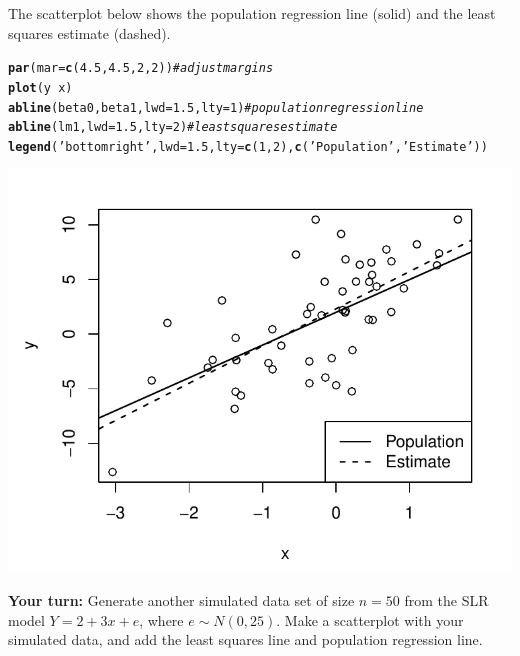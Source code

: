 \documentclass[11pt]{article}\usepackage[]{graphicx}\usepackage[]{color}
\makeatletter
\def\maxwidth{ %
  \ifdim\Gin@nat@width>\linewidth
    \linewidth
  \else
    \Gin@nat@width
  \fi
}
\newcommand{\hlnum}[1]{\textcolor[rgb]{0.686,0.059,0.569}{#1}}%
\newcommand{\hlstr}[1]{\textcolor[rgb]{0.192,0.494,0.8}{#1}}%
\newcommand{\hlcom}[1]{\textcolor[rgb]{0.678,0.584,0.686}{\textit{#1}}}%
\newcommand{\hlopt}[1]{\textcolor[rgb]{0,0,0}{#1}}%
\newcommand{\hlstd}[1]{\textcolor[rgb]{0.345,0.345,0.345}{#1}}%
\newcommand{\hlkwc}[1]{\textcolor[rgb]{0.333,0.667,0.333}{#1}}%
\newcommand{\hlkwd}[1]{\textcolor[rgb]{0.737,0.353,0.396}{\textbf{#1}}}%
\newenvironment{kframe}{%
 \def\at@end@of@kframe{}%
 \ifinner\ifhmode%
  \def\at@end@of@kframe{\end{minipage}}%
  \begin{minipage}{\columnwidth}%
 \fi\fi%
 \def\FrameCommand##1{\hskip\@totalleftmargin \hskip-\fboxsep
 \colorbox{shadecolor}{##1}\hskip-\fboxsep
     \hskip-\linewidth \hskip-\@totalleftmargin \hskip\columnwidth}%
 \MakeFramed {\advance\hsize-\width
   \@totalleftmargin\z@ \linewidth\hsize
   \@setminipage}}%
 {\par\unskip\endMakeFramed%
 \at@end@of@kframe}
\newenvironment{knitrout}{}{} %
\makeatother
\begin{document}
The scatterplot below shows the population regression line (solid) and the least squares estimate (dashed).

\begin{knitrout}
\color{fgcolor}\begin{kframe}
\begin{alltt}
\hlkwd{par}\hlstd{(}\hlkwc{mar}\hlstd{=}\hlkwd{c}\hlstd{(}\hlnum{4.5}\hlstd{,}\hlnum{4.5}\hlstd{,}\hlnum{2}\hlstd{,}\hlnum{2}\hlstd{))} \hlcom{#adjust margins}
\hlkwd{plot}\hlstd{(y} \hlopt{~} \hlstd{x)}
\hlkwd{abline}\hlstd{(beta0, beta1,} \hlkwc{lwd}\hlstd{=}\hlnum{1.5}\hlstd{,} \hlkwc{lty}\hlstd{=}\hlnum{1}\hlstd{)} \hlcom{# population regression line}
\hlkwd{abline}\hlstd{(lm1,} \hlkwc{lwd}\hlstd{=}\hlnum{1.5}\hlstd{,} \hlkwc{lty}\hlstd{=}\hlnum{2}\hlstd{)} \hlcom{# least squares estimate}
\hlkwd{legend}\hlstd{(}\hlstr{'bottomright'}\hlstd{,} \hlkwc{lwd}\hlstd{=}\hlnum{1.5}\hlstd{,} \hlkwc{lty}\hlstd{=}\hlkwd{c}\hlstd{(}\hlnum{1}\hlstd{,} \hlnum{2}\hlstd{),} \hlkwd{c}\hlstd{(}\hlstr{'Population'}\hlstd{,} \hlstr{'Estimate'}\hlstd{))}
\end{alltt}
\end{kframe}
\includegraphics[width=\maxwidth]{figure/unnamed-chunk-3-1} 

\end{knitrout}

\textbf{Your turn:}  Generate another simulated data set of size $n=50$ from the SLR model $Y = 2 + 3x + e$, where $e \sim N(0, 25)$.  Make a scatterplot with your simulated data, and add the least squares line and population regression line.\\    
\clearpage
\end{document}
